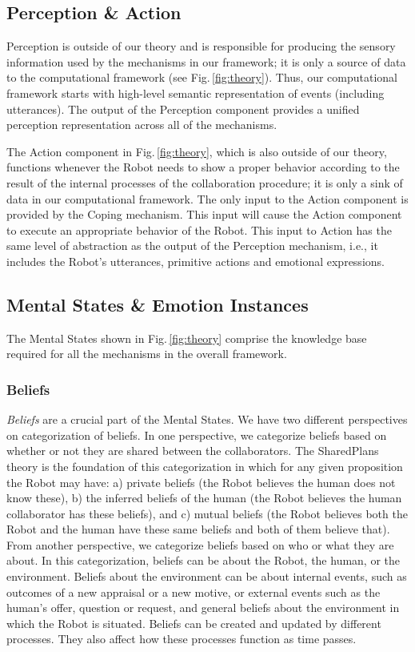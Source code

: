 \subsection{Perception \& Action}
\label{sec:tom-mech}

Perception is outside of our theory and is responsible for producing the sensory
information used by the mechanisms in our framework; it is only a source of data
to the computational framework (see Fig.\,\ref{fig:theory}). Thus, our
computational framework starts with high-level semantic representation of events
(including utterances). The output of the Perception component provides a
unified perception representation across all of the mechanisms.

The Action component in Fig.\,\ref{fig:theory}, which is also outside of our
theory, functions whenever the Robot needs to show a proper behavior according
to the result of the internal processes of the collaboration procedure; it is
only a sink of data in our computational framework. The only input to the Action
component is provided by the Coping mechanism. This input will cause the Action
component to execute an appropriate behavior of the Robot. This input to Action
has the same level of abstraction as the output of the Perception mechanism,
i.e., it includes the Robot's utterances, primitive actions and emotional
expressions.

\subsection{Mental States \& Emotion Instances}
\label{sec:mental-states}

The Mental States shown in Fig.\,\ref{fig:theory} comprise the knowledge base
required for all the mechanisms in the overall framework.

\subsubsection{Beliefs}
\label{sec:beliefs}

\textit{Beliefs} are a crucial part of the Mental States. We have two different
perspectives on categorization of beliefs. In one perspective, we categorize
beliefs based on whether or not they are shared between the collaborators. The
SharedPlans \cite{grosz:plans-discourse} theory is the foundation of this
categorization in which for any given proposition the Robot may have: a) private
beliefs (the Robot believes the human does not know these), b) the inferred
beliefs of the human (the Robot believes the human collaborator has these
beliefs), and c) mutual beliefs (the Robot believes both the Robot and the human
have these same beliefs and both of them believe that). From another
perspective, we categorize beliefs based on who or what they are about. In this
categorization, beliefs can be about the Robot, the human, or the environment.
Beliefs about the environment can be about internal events, such as outcomes of
a new appraisal or a new motive, or external events such as the human's offer,
question or request, and general beliefs about the environment in which the
Robot is situated. Beliefs can be created and updated by different processes.
They also affect how these processes function as time passes.

